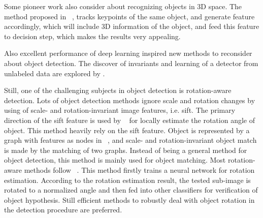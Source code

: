 Some pioneer work also consider about recognizing objects in 3D space. The method proposed in ~\cite{r3d}, tracks keypoints of the same object, and generate feature accordingly, which will include 3D information of the object, and feed this feature to decision step, which makes the results very appealing.

Also excellent performance of deep learning inspired new methods to reconsider about object detection. The discover of invariants and learning of a detector from unlabeled data are explored by \cite{dnnnn}.


Still, one of the challenging subjects in object detection is rotation-aware detection. Lots of object detection methods ignore scale and rotation changes by using of scale- and rotation-invariant image features, i.e. sift.
The primary  direction of the sift feature is used by ~\cite{ac21} for locally estimate the rotation angle of object. This method heavily rely on the sift feature.
Object is represented by a graph with features as nodes in ~\cite{ac222}, and scale- and rotation-invariant object match is made by the matching of two graphs. Instead of being a general method for object detection, this method is mainly used for object matching.
Most rotation-aware methods follow ~\cite{ac20}. This method firstly trains a neural network for rotation estimation. According to the rotation estimation result, the tested sub-image is rotated to a normalized angle and then fed into other classifiers for verification of object hypothesis. Still efficient methods to robustly deal with object rotation in the detection procedure are preferred.




\begin{comment}
(a) a well-de?ned closed boundary
in space; (b) a different appearance from their surroundings [23, 25]; (c) sometimes it is unique within the image
and stands out as salient
\end{comment}

